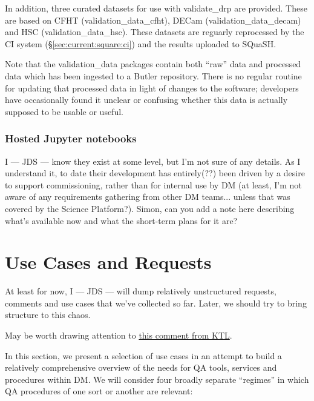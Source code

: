 \documentclass[DM,authoryear,toc,lsstdraft]{lsstdoc}
\begin{document}
In addition, three curated datasets for use with validate\_drp are provided.
These are based on CFHT (validation\_data\_cfht), DECam
(validation\_data\_decam) and HSC (validation\_data\_hsc). These datasets are
reguarly reprocessed by the CI system (\S\ref{sec:current:square:ci}) and the
results uploaded to SQuaSH.

Note that the validation\_data packages contain both ``raw'' data and
processed data which has been ingested to a Butler repository. There is no
regular routine for updating that processed data in light of changes to the
software; developers have occasionally found it unclear or confusing whether
this data is actually supposed to be usable or useful.

\subsubsection{Hosted Jupyter notebooks}
\label{sec:current:square:jl}

\begin{draftnote}
I --- JDS --- know they exist at some level, but I'm not sure of any details.
As I understand it, to date their development has entirely(??) been driven by
a desire to support commissioning, rather than for internal use by DM (at
least, I'm not aware of any requirements gathering from other DM teams...
unless that was covered by the Science Platform?). Simon, can you add a note
here describing what's available now and what the short-term plans for it are?
\end{draftnote}

\section{Use Cases and Requests}
\label{sec:use}

\begin{draftnote}
At least for now, I --- JDS --- will dump relatively unstructured requests,
comments and use cases that we've collected so far. Later, we should try to
bring structure to this chaos.

May be worth drawing attention to
\href{https://github.com/lsst-dm/dmtn-074/commit/06fa883ebeb12cf728dda14fa82e4c1f01fa5696#r27754730}{this
comment from KTL}.
\end{draftnote}

In this section, we present a selection of use cases in an attempt to build a
relatively comprehensive overview of the needs for QA tools, services and
procedures within DM. We will consider four broadly separate ``regimes'' in
which QA procedures of one sort or another are relevant:
\end{document}
